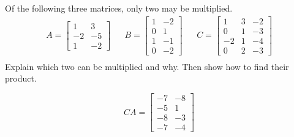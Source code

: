 
\begin{exerciseStatement}


Of the following three matrices, only two may be multiplied. 
\begin{align*} A= \left[\begin{array}{cc}
1 & 3 \\
-2 & -5 \\
1 & -2
\end{array}\right]  & & B= \left[\begin{array}{cc}
1 & -2 \\
0 & 1 \\
1 & -1 \\
0 & -2
\end{array}\right]  & & C= \left[\begin{array}{ccc}
1 & 3 & -2 \\
0 & 1 & -3 \\
-2 & 1 & -4 \\
0 & 2 & -3
\end{array}\right]  \\ \end{align*}
             Explain which two can be multiplied and why. Then show how to find their product.


\end{exerciseStatement}
    
\begin{exerciseAnswer} 
\[CA= \left[\begin{array}{cc}
-7 & -8 \\
-5 & 1 \\
-8 & -3 \\
-7 & -4
\end{array}\right] \]
\end{exerciseAnswer}
    
